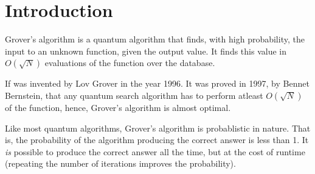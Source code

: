 \documentclass[a4paper]{article}
\begin{document}
\section{Introduction}

Grover's algorithm is a quantum algorithm that finds, with high probability,
the input to an unknown function, given the output value. It finds this value
in $ O(\sqrt{N}) $ evaluations of the function over the database.

If was invented by Lov Grover in the year 1996. It was proved in 1997, 
by Bennet Bernstein, that any quantum search algorithm has to perform atleast 
$ O(\sqrt{N}) $ of the function, hence, Grover's algorithm is almost optimal.

Like most quantum algorithms, Grover's algorithm is probablistic in nature. 
That is, the probability of the algorithm producing the correct answer is less than 1.
It \textit{is} possible to produce the correct answer all the time, but at the cost 
of runtime (repeating the number of iterations improves the probability).
\end{document}

